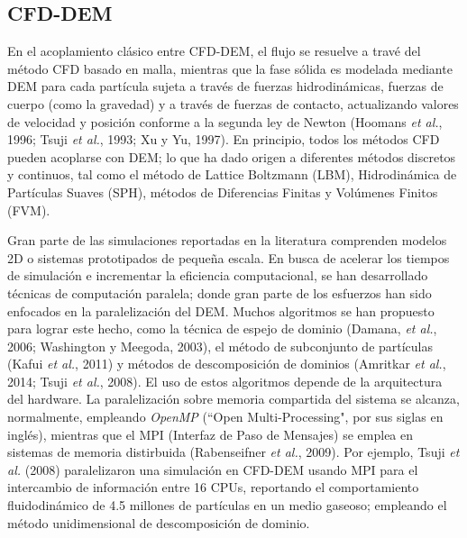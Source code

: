 \begin{center}
	\section{CFD-DEM}
\end{center}

\noindent
\justify

En el acoplamiento cl\'asico entre CFD-DEM, el flujo se resuelve a trav\'e del m\'etodo CFD basado en malla, mientras que la fase s\'olida es modelada mediante DEM para cada part\'icula sujeta a trav\'es de fuerzas hidrodin\'amicas, fuerzas de cuerpo (como la gravedad) y a trav\'es de fuerzas de contacto, actualizando valores de velocidad y posici\'on conforme a la segunda ley de Newton (Hoomans \textit{et al.}, 1996; Tsuji \textit{et al.}, 1993; Xu y Yu, 1997). En principio, todos los m\'etodos CFD pueden acoplarse con DEM; lo que ha dado origen a diferentes m\'etodos discretos y continuos, tal como el m\'etodo de Lattice Boltzmann (LBM), Hidrodin\'amica de Part\'iculas Suaves (SPH), m\'etodos de Diferencias Finitas y Vol\'umenes Finitos (FVM).

\noindent
\justify

Gran parte de las simulaciones reportadas en la literatura comprenden modelos 2D o sistemas prototipados de peque\~na escala. En busca de acelerar los tiempos de simulaci\'on e incrementar la eficiencia computacional, se han desarrollado t\'ecnicas de computaci\'on paralela; donde gran parte de los esfuerzos han sido enfocados en la paralelizaci\'on del DEM. Muchos algoritmos se han propuesto para lograr este hecho, como la t\'ecnica de espejo de dominio (Damana, \textit{et al.}, 2006; Washington y Meegoda, 2003), el m\'etodo de subconjunto de part\'iculas (Kafui \textit{et al.}, 2011) y m\'etodos de descomposici\'on de dominios (Amritkar \textit{et al.}, 2014; Tsuji \textit{et al.}, 2008). El uso de estos algoritmos depende de la arquitectura del hardware. La paralelizaci\'on sobre memoria compartida del sistema se alcanza, normalmente, empleando \textit{OpenMP} (``Open Multi-Processing", por sus siglas en ingl\'es), mientras que el MPI (Interfaz de Paso de Mensajes) se emplea en sistemas de memoria distirbuida (Rabenseifner \textit{et al.}, 2009). Por ejemplo, Tsuji \textit{et al.} (2008) paralelizaron una simulaci\'on en CFD-DEM usando MPI para el intercambio de informaci\'on entre 16 CPUs, reportando el comportamiento fluidodin\'amico de 4.5 millones de part\'iculas en un medio gaseoso; empleando el m\'etodo unidimensional de descomposici\'on de dominio.


